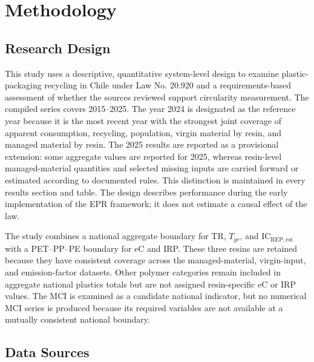 \documentclass[review,10pt]{elsarticle}
\newcommand{\changepar}[1]{#1\par\medskip}
\begin{document}
\section{Methodology}
\subsection{Research Design}

\changepar{This study uses a descriptive, quantitative system-level design to examine plastic-packaging recycling in Chile under Law No. 20.920 and a requirements-based assessment of whether the sources reviewed support circularity measurement. The compiled series covers 2015--2025. The year 2024 is designated as the reference year because it is the most recent year with the strongest joint coverage of apparent consumption, recycling, population, virgin material by resin, and managed material by resin. The 2025 results are reported as a provisional extension: some aggregate values are reported for 2025, whereas resin-level managed-material quantities and selected missing inputs are carried forward or estimated according to documented rules. This distinction is maintained in every results section and table. The design describes performance during the early implementation of the EPR framework; it does not estimate a causal effect of the law.}

\changepar{The study combines a national aggregate boundary for TR, $T_{gr}$, and IC$_{\mathrm{REP,est}}$ with a PET--PP--PE boundary for eC and IRP. These three resins are retained because they have consistent coverage across the managed-material, virgin-input, and emission-factor datasets. Other polymer categories remain included in aggregate national plastics totals but are not assigned resin-specific eC or IRP values. The MCI is examined as a candidate national indicator, but no numerical MCI series is produced because its required variables are not available at a mutually consistent national boundary.}

\subsection{Data Sources}
\end{document}
